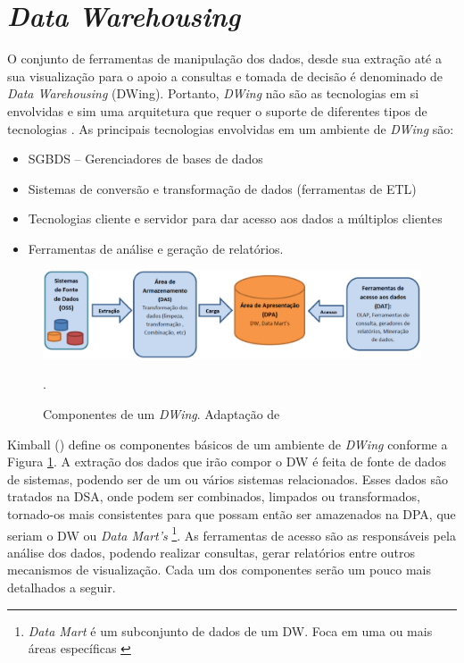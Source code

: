 \section{\emph{Data Warehousing}}

O conjunto de ferramentas de manipulação dos dados, desde sua extração até a sua visualização para o apoio a consultas e tomada de decisão é denominado de \emph{Data Warehousing} (DWing). Portanto,  \emph{DWing} não são as tecnologias em si envolvidas e sim uma arquitetura que requer o suporte de diferentes tipos de tecnologias \cite{inmon2002}.  As principais tecnologias envolvidas em um ambiente de \emph{DWing} são:


\begin{itemize}
\item SGBDS – Gerenciadores de bases de dados
\item Sistemas de conversão e transformação de dados (ferramentas de ETL)
\item Tecnologias cliente e servidor para dar acesso aos dados a múltiplos clientes
\item Ferramentas de análise e geração de relatórios.
\end{itemize}


 \begin{figure}[H]
 	\centering
 		\includegraphics[scale=0.5]{figuras/componentesDW}
 		\caption{Componentes de um \emph{DWing}. Adaptação de \cite{kimball2002}}.
 		\label{componentesdw}
 \end{figure}

Kimball (\citeyear{kimball2002}) define os componentes básicos de um ambiente de \emph{DWing} conforme a Figura \ref{componentesdw}. A extração dos dados que irão compor o DW é feita de fonte de dados de sistemas, podendo ser de um ou vários sistemas relacionados. Esses dados são tratados na DSA, onde podem ser combinados, limpados ou transformados, tornado-os mais consistentes para que possam então ser amazenados na DPA, que seriam o DW ou \emph{Data Mart's}
 \footnote{\emph{Data Mart} é um subconjunto de dados de um DW. Foca em uma ou mais áreas específicas \cite{kimball2002}}. 
 As ferramentas de acesso são as responsáveis pela análise dos dados, podendo realizar consultas, gerar relatórios entre outros mecanismos de visualização. Cada um dos componentes serão um pouco mais detalhados a seguir.

